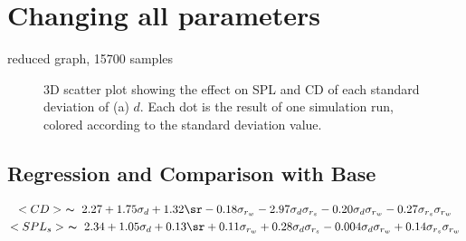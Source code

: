 \section{Changing all parameters}\label{sec:change}
reduced graph, 15700 samples

\begin{figure}[hbt!]\centering
    \caption{3D scatter plot showing the effect on SPL and CD of each
    standard deviation of
    (a) $d$. Each dot is the result of one simulation run, colored
    according to the standard deviation value.}
    \label{figure}
\end{figure}


\subsection{Regression and Comparison with Base}

\begin{gather}\label{eq:cared}
    <CD> ~ \thicksim ~ 2.27 + 1.75\sd + 1.32\sr - 0.18\sw -
                2.97\ds - 0.20\dw - 0.27\ssw \label{ca1}\\
    <SPL_s> ~ \thicksim ~ 2.34 + 1.05\sd + 0.13\sr + 0.11 \sw +
                0.28\ds - 0.004\dw + 0.14\ssw \label{ca2}
\end{gather}

